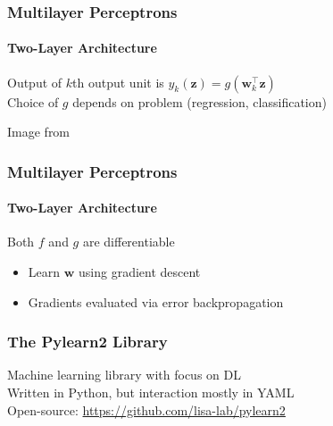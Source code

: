 \documentclass[xetex,professionalfont]{beamer}
\renewcommand{\vec}[1]{\ensuremath{\mathbf{#1}}}
\newcommand{\vw}{\vec{w}}
\newcommand{\vz}{\vec{z}}
\begin{document}

\begin{frame}
\frametitle{Multilayer Perceptrons}
\framesubtitle{Two-Layer Architecture}

Output of $k$th output unit is $y_k(\vz)=g(\vw_k^\top\vz)$\\\medskip %
Choice of $g$ depends on problem (regression, classification) %

\bigskip
\begin{center}
	{\centering Image from \cite{bishop2006}}
\end{center}

\end{frame}


\begin{frame}
\frametitle{Multilayer Perceptrons}
\framesubtitle{Two-Layer Architecture}

Both $f$ and $g$ are differentiable
\begin{itemize}
	\item Learn $\vw$ using gradient descent %
	\item Gradients evaluated via error backpropagation %
\end{itemize}

\end{frame}



\begin{frame}
\frametitle{The Pylearn2 Library}

Machine learning library with focus on DL\\\medskip
Written in Python, but interaction mostly in YAML\\\medskip
Open-source: \url{https://github.com/lisa-lab/pylearn2}

\end{frame}
\end{document}
